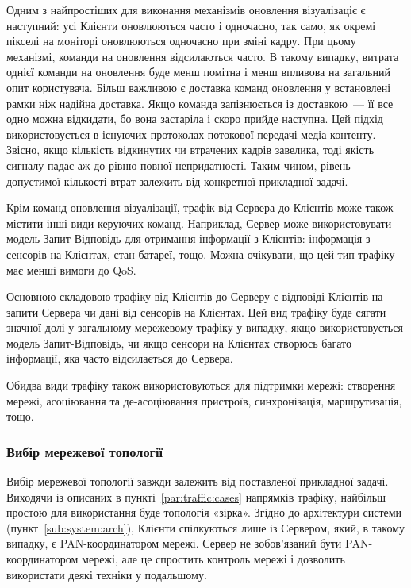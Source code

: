 \documentclass[a4paper,ukrainian,utf8,nocolumnsxix,floatsection,equationsection]{eskdtext}
\renewcommand\paragraph{\subsubsection}
\begin{document}
Одним з найпростіших для виконання механізмів оновлення візуалізаціє є наступний: усі Клієнти оновлюються часто і одночасно, так само, як окремі пікселі на моніторі оновлюються одночасно при зміні кадру. При цьому механізмі, команди на оновлення відсилаються часто. В такому випадку, витрата однієї команди на оновлення буде менш помітна і менш впливова на загальний опит користувача. Більш важливою є доставка  команд оновлення у встановлені рамки ніж надійна доставка. Якщо команда запізнюється із доставкою~--- її все одно можна відкидати, бо вона застаріла і скоро прийде наступна. Цей підхід використовується в існуючих протоколах потокової передачі медіа-контенту. Звісно, якщо кількість відкинутих чи втрачених кадрів завелика, тоді якість сигналу падає аж до рівню повної непридатності. Таким чином, рівень допустимої кількості втрат залежить від конкретної прикладної задачі.

Крім команд оновлення візуалізації, трафік від Сервера до Клієнтів може також містити інші види керуючих команд. Наприклад, Сервер може використовувати модель Запит-Відповідь для отримання інформації з Клієнтів: інформація з сенсорів на Клієнтах, стан батареї, тощо. Можна очікувати, що цей тип трафіку має менші вимоги до QoS.

Основною складовою трафіку від Клієнтів до Серверу є відповіді Клієнтів на запити Сервера чи дані від сенсорів на Клієнтах. Цей вид трафіку буде сягати значної долі у загальному мережевому трафіку у випадку, якщо використовується модель Запит-Відповідь, чи якщо сенсори на Клієнтах створюсь багато інформації, яка часто відсилається до Сервера.

Обидва види трафіку також використовуються для підтримки мережі: створення мережі, асоціювання та де-асоціювання пристроїв, синхронізація, маршрутизація, тощо.

\paragraph{Вибір мережевої топології}

Вибір мережевої топології завжди залежить від поставленої прикладної задачі. Виходячи із описаних в пункті~\ref{par:traffic:cases} напрямків трафіку, найбільш простою для використання буде топологія «зірка». Згідно до архітектури системи (пункт~\ref{sub:system:arch}), Клієнти спілкуються лише із Сервером, який, в такому випадку, є PAN-координатором мережі. Сервер не зобов'язаний бути PAN-координатором мережі, але це спростить контроль мережі і дозволить використати деякі техніки у подальшому.
\end{document}
